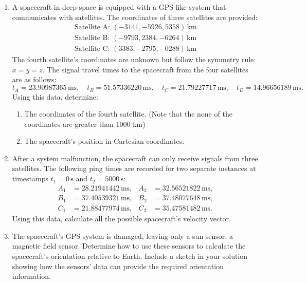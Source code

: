 \documentclass[a4paper, 12pt]{exam}
\begin{document}
\begin{enumerate}[label = (\alph*)]
	\item A spacecraft in deep space is equipped with a GPS-like system that communicates with satellites. The coordinates of three satellites are provided:
	\begin{align*}
		\text{Satellite A: } (-3141, -5926, 5358) \, \text{km} \\
		\text{Satellite B: } (-9793, 2384, -6264) \, \text{km} \\
		\text{Satellite C: } (3383, -2795, -0288) \, \text{km}
	\end{align*}
	The fourth satellite's coordinates are unknown but follow the symmetry rule: \(x = y = z\). The signal travel times to the spacecraft from the four satellites are as follows:
	\begin{equation}
	t_A = 23.90987365 \, \text{ms}, \quad
	t_B = 51.57336220 \, \text{ms}, \quad
	t_C = 21.79227717 \, \text{ms}, \quad
	t_D = 14.96656189 \, \text{ms}.
	\end{equation}
	Using this data, determine:
	\begin{enumerate}[label = (\roman*)]
		\item The coordinates of the fourth satellite. (Note that the none of the coordinates are greater than 1000 km)
		\item The spacecraft's position in Cartesian coordinates.
	\end{enumerate}
	
	\item After a system malfunction, the spacecraft can only receive signals from three satellites. The following ping times are recorded for two separate instances at timestamps \(t_1 = 0 \, \text{s}\) and \(t_2 = 5000 \, \text{s}\):
	\begin{align*}
		A_1 &= 28.21941442 \, \text{ms}, & A_2 &= 32.56521822 \, \text{ms}, \\
		B_1 &= 37.40539321 \, \text{ms}, & B_2 &= 37.48077648 \, \text{ms}, \\
		C_1 &= 21.88477974 \, \text{ms}, & C_2 &= 35.47581482 \, \text{ms}.
	\end{align*}
	Using this data, calculate all the possible spacecraft's velocity vector.
	
	\item The spacecraft's GPS system is damaged, leaving only a sun sensor, a magnetic field sensor. Determine how to use these sensors to calculate the spacecraft's orientation relative to Earth. Include a sketch in your solution showing how the sensors' data can provide the required orientation information.
\end{enumerate}
\end{document}
